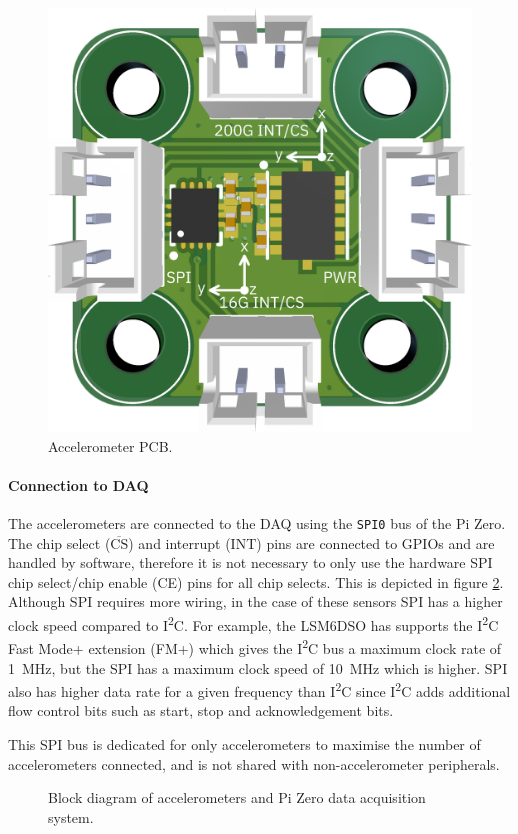 \documentclass{report}
\newcommand{\textoverline}[1]{$\overline{\mbox{#1}}$}
\newcommand{\iic}{{I\textsuperscript{2}C}}
\begin{document}
\begin{figure}[H]
  \centering
  \includegraphics[width=0.5\linewidth]{images/Accelerometers_PCB.png}
  \caption{Accelerometer PCB.}
  \label{fig:accelerometers-pcb}
\end{figure}

\paragraph{Connection to DAQ}

The accelerometers are connected to the DAQ using the \texttt{SPI0} bus of the Pi Zero. The chip select (\textoverline{CS}) and interrupt (INT) pins are connected to GPIOs and are handled by software, therefore it is not necessary to only use the hardware SPI chip select/chip enable (CE) pins for all chip selects. This is depicted in figure \ref{fig:accelerometers-sch-block}. Although SPI requires more wiring, in the case of these sensors SPI has a higher clock speed compared to {\iic}. For example, the LSM6DSO has supports the {\iic} Fast Mode+ extension (FM+) which gives the {\iic} bus a maximum clock rate of \SI{1}{\mega\hertz}, but the SPI has a maximum clock speed of \SI{10}{\mega\hertz} which is higher. SPI also has higher data rate for a given frequency than {\iic} since {\iic} adds additional flow control bits such as start, stop and acknowledgement bits.

This SPI bus is dedicated for only accelerometers to maximise the number of accelerometers connected, and is not shared with non-accelerometer peripherals.

\begin{figure}[H]
  \centering
  
  \caption{Block diagram of accelerometers and Pi Zero data acquisition system.}
  \label{fig:accelerometers-sch-block}
\end{figure}
\end{document}
